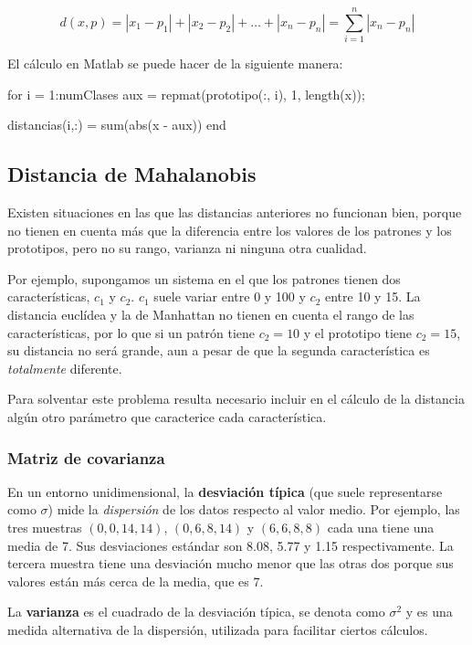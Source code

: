 \documentclass[11pt]{scrartcl}
\begin{document}
$$
d(x,p) = |x_1 - p_1| + |x_2 - p_2| + \dots + |x_n - p_n| = \sum^n_{i=1} |x_n - p_n|
$$

El cálculo en Matlab se puede hacer de la siguiente manera:

\begin{matlabcode}
for i = 1:numClases
  aux = repmat(prototipo(:, i), 1, length(x));
  
  distancias(i,:) = sum(abs(x - aux))
end
\end{matlabcode}

\subsection{Distancia de Mahalanobis}

Existen situaciones en las que las distancias anteriores no funcionan bien,
porque no tienen en cuenta más que la diferencia entre los valores de los
patrones y los prototipos, pero no su rango, varianza ni ninguna otra cualidad.

Por ejemplo, supongamos un sistema en el que los patrones tienen dos
características, $c_1$ y $c_2$. $c_1$ suele variar entre 0 y 100 y $c_2$ entre
10 y 15. La distancia euclídea y la de Manhattan no tienen en cuenta el rango de
las características, por lo que si un patrón tiene $c_2 = 10$ y el prototipo
tiene $c_2 = 15$, su distancia no será grande, aun a pesar de que la segunda
característica es \textit{totalmente} diferente.

Para solventar este problema resulta necesario incluir en el cálculo de la
distancia algún otro parámetro que caracterice cada característica.

\subsubsection{Matriz de covarianza}

En un entorno unidimensional, la \textbf{desviación típica} (que suele
representarse como $\sigma$) mide la \textit{dispersión} de los datos respecto
al valor medio. Por ejemplo, las tres muestras $(0, 0, 14, 14)$, $(0, 6, 8, 14)$
y $(6, 6, 8, 8)$ cada una tiene una media de 7. Sus desviaciones estándar son
8.08, 5.77 y 1.15 respectivamente. La tercera muestra tiene una desviación mucho
menor que las otras dos porque sus valores están más cerca de la media, que es
7.

La \textbf{varianza} es el cuadrado de la desviación típica, se denota como
$\sigma^2$ y es una medida alternativa de la dispersión, utilizada para
facilitar ciertos cálculos.
\end{document}
